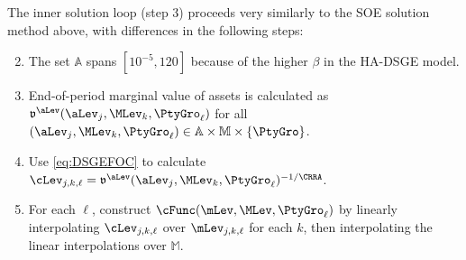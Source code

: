 The inner solution loop (step 3) proceeds very similarly to the SOE solution method above,
with differences in the following steps:
\begin{enumerate}
\setcounter{enumi}{1}

\item The set $\mathbb{A}$ spans $[10^{-5},120]$ because of the higher $\beta$ in the HA-DSGE model.

\setcounter{enumi}{4}

\item End-of-period marginal value of assets is calculated as $\mathfrak{v}^\aLev(\aLev_j,\MLev_k,\PtyGro_\ell)$
for all $(\aLev_j,\MLev_k,\PtyGro_\ell) \in \mathbb{A} \times \mathbb{M} \times \{\PtyGro\}$.

\item Use \eqref{eq:DSGEFOC} to calculate $\cLev_{j,k,\ell} = \mathfrak{v}^\aLev(\aLev_j,\MLev_k,\PtyGro_\ell)^{-1/\CRRA}$.

\setcounter{enumi}{7}

\item For each $\ell$, construct $\cFunc(\mLev,\MLev,\PtyGro_\ell)$ by linearly interpolating $\cLev_{j,k,\ell}$ over $\mLev_{j,k,\ell}$
for each $k$, then interpolating the linear interpolations over $\mathbb{M}$.
\end{enumerate}
